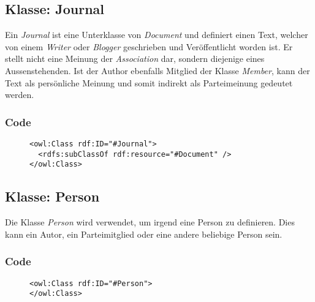\documentclass[
    11pt,
    latin1,
    a4paper,
    oneside
]{scrreprt}
\begin{document}
\subsection{Klasse: Journal} \label{sec:class_journal}

Ein \emph{Journal} ist eine Unterklasse von \emph{Document} und definiert einen Text, welcher von einem \emph{Writer} oder \emph{Blogger} geschrieben und Ver\"offentlicht worden ist. Er stellt nicht eine Meinung der \emph{Association} dar, sondern diejenige eines Aussenstehenden. Ist der Author ebenfalls Mitglied der Klasse \emph{Member}, kann der Text als pers\"onliche Meinung und somit indirekt als Parteimeinung gedeutet werden.

\subsubsection{Code} \label{sec:class_journal_code}

\begin{figure}[h]
 \lstset{language=XML}
 \begin{lstlisting}[label=owl:journal,caption={Ein \emph{Journal} ist ein Bericht \"uber eine \emph{Association}, welcher von einer \emph{Organization} herausgegeben wurde}]
<owl:Class rdf:ID="#Journal">
  <rdfs:subClassOf rdf:resource="#Document" />
</owl:Class>
 \end{lstlisting}
\end{figure}

\subsection{Klasse: Person} \label{sec:class_person}

Die Klasse \emph{Person} wird verwendet, um irgend eine Person zu definieren. Dies kann ein Autor, ein Parteimitglied oder eine andere beliebige Person sein.

\subsubsection{Code} \label{sec:class_person_code}

\begin{figure}[h]
 \lstset{language=XML}
 \begin{lstlisting}[label=owl:person,caption={Die Klasse \emph{Person} definiert alle Personen}]
<owl:Class rdf:ID="#Person">
</owl:Class>
 \end{lstlisting}
\end{figure}
\end{document}
